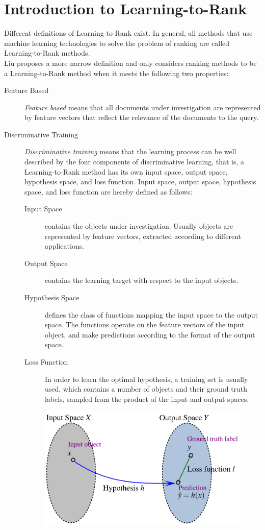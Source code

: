 \chapter{Introduction to Learning-to-Rank}
Different definitions of Learning-to-Rank exist. In general, all methods that use machine learning technologies to solve the problem of ranking are called Learning-to-Rank methods.\\
Liu \cite{Liu2007} proposes a more narrow definition and only considers ranking methods to be a Learning-to-Rank method when it meets the following two properties:
\begin{description}
\item[Feature Based]{\emph{Feature based} means that all documents under investigation are represented by feature vectors that reflect the relevance of the documents to the query.}
\item[Discriminative Training]{\emph{Discriminative training} means that the learning process can be well described by the four components of discriminative learning, that is, a Learning-to-Rank method has its own input space, output space, hypothesis space, and loss function. Input space, output space, hypothesis space, and loss function are hereby defined as follows:
	\begin{description}
	\item[Input Space]{contains the objects under investigation. Usually objects are represented by feature vectors, extracted according to different applications.}
	\item[Output Space]{contains the learning target with respect to the input objects.}
	\item[Hypothesis Space]{defines the class of functions mapping the input space to the output space. The functions operate on the feature vectors of the input object, and make predictions according to the format of the output space.}
	\item[Loss Function]{In order to learn the optimal hypothesis, a training set is usually used, which contains a number of objects and their ground truth labels, sampled from the product of the input and output spaces.}
	\end{description}
\begin{figure}
\includegraphics[scale=0.4]{gfx/descriminative_training}

\end{figure}}
\end{description}
